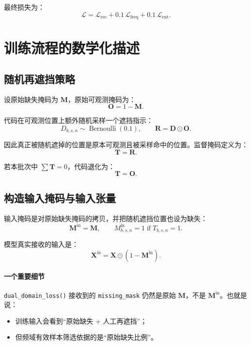 \documentclass[UTF8]{ctexart}
\begin{document}
最终损失为：
\begin{equation}
    \mathcal{L}
    =
    \mathcal{L}_{\text{rec}}
    +
    0.1\,\mathcal{L}_{\text{freq}}
    +
    0.1\,\mathcal{L}_{\text{ent}}.
\end{equation}

\section{训练流程的数学化描述}

\subsection{随机再遮挡策略}

设原始缺失掩码为 $\bm{M}$，原始可观测掩码为：
\begin{equation}
    \bm{O} = 1 - \bm{M}.
\end{equation}

代码在可观测位置上额外随机采样一个遮挡指示：
\begin{equation}
    D_{b,s,n} \sim \operatorname{Bernoulli}(0.1),
    \qquad
    \bm{R} = \bm{D} \odot \bm{O}.
\end{equation}

因此真正被随机遮掉的位置是原本可观测且被采样命中的位置。监督掩码定义为：
\begin{equation}
    \bm{T} = \bm{R}.
\end{equation}

若本批次中 $\sum \bm{T}=0$，代码退化为：
\begin{equation}
    \bm{T} = \bm{O}.
\end{equation}

\subsection{构造输入掩码与输入张量}

输入掩码是对原始缺失掩码的拷贝，并把随机遮挡位置也设为缺失：
\begin{equation}
    \bm{M}^{\text{in}} = \bm{M}, \qquad
    M^{\text{in}}_{b,s,n} = 1 \;\text{if}\; T_{b,s,n}=1.
\end{equation}

模型真实接收的输入是：
\begin{equation}
    \bm{X}^{\text{in}} = \bm{X} \odot (1-\bm{M}^{\text{in}}).
\end{equation}

\paragraph{一个重要细节}
\texttt{dual\_domain\_loss()} 接收到的 \texttt{missing\_mask} 仍然是原始 $\bm{M}$，不是 $\bm{M}^{\text{in}}$。也就是说：
\begin{itemize}
    \item 训练输入会看到“原始缺失 + 人工再遮挡”；
    \item 但频域有效样本筛选依据的是“原始缺失比例”。
\end{itemize}
\end{document}
